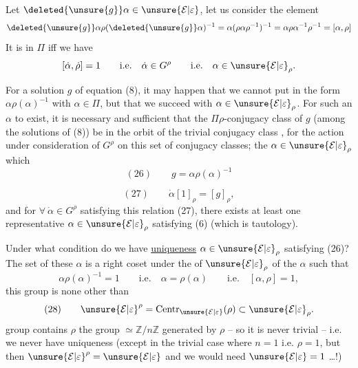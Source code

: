 Let $\deleted{\unsure{g}}\alpha\in\unsure{\mathcal E|\varepsilon}$, let us consider the element
\[
\deleted{\unsure{g}}\alpha\rho(\deleted{\unsure{g}}\alpha)^{-1}
=\alpha(\rho\alpha\rho^{-1})^{-1}
=\alpha\rho\alpha^{-1}\rho^{-1}=[\alpha,\rho]
\]
It is in $\Pi$ iff we have 
\[
[\dot\alpha,\dot\rho]=1\qquad\text{i.e.}\quad
\dot\alpha\in G^\rho\qquad\text{i.e.}\quad\alpha\in\unsure{\mathcal E|\varepsilon}_\rho.
\]

For a solution $g$ of equation (8), it may happen that we cannot put  in the  form $\alpha\rho(\alpha)^{-1}$ with $\alpha\in\Pi$, but that we succeed with $\alpha\in\unsure{\mathcal E|\varepsilon}_\rho$.
For such an $\alpha$ to exist, it is necessary and sufficient that the $\Pi\rho$-conjugacy class \inserted{$[g]_\rho$} of $g$ (among the solutions of (8)) be in the orbit of the trivial conjugacy class \inserted{$[1]_\rho$}, for the action under consideration of $G^\rho$ on this set of conjugacy classes;  the $\alpha\in\unsure{\mathcal E|\varepsilon}_\rho$ which 
\[
(26)\qquad g=\alpha\rho(\alpha)^{-1}
\]


\[
(27)\qquad\dot\alpha[1]_\rho=[g]_\rho,
\]
and for $\forall\ \dot\alpha\in G^\rho$ satisfying this relation (27), there exists at least one representative $\alpha\in\unsure{\mathcal E|\varepsilon}_\rho$ satisfying (6) (which is  tautology).

Under what condition do we have \uline{uniqueness}  $\alpha\in\unsure{\mathcal E|\varepsilon}_\rho$ satisfying (26)?
The set of these $\alpha$ is a right coset under the  of $\unsure{\mathcal E|\varepsilon}_\rho$  of the $\alpha$ such that 
\[
\alpha\rho(\alpha)^{-1}=1\qquad\text{i.e.}\quad
\alpha=\rho(\alpha)\qquad\text{i.e.}\quad[\alpha,\rho]=1,
\]
this group is none other than 
\[
(28)\qquad\unsure{\mathcal E|\varepsilon}^\rho=\operatorname{Centr}_{\unsure{\mathcal E|\varepsilon}}(\rho)\subset\unsure{\mathcal E|\varepsilon}_\rho.
\]
 group contains $\rho$  the group $\simeq\mathbb Z/n\mathbb Z$  generated by $\rho$ -- so it is never trivial -- i.e. we never have uniqueness (except in the trivial case where \deleted{\unsure{$\rho$}} $n=1$ i.e. $\rho=1$,  but then $\unsure{\mathcal E|\varepsilon}^\rho=\unsure{\mathcal E|\varepsilon}$ and we would need $\unsure{\mathcal E|\varepsilon}=1$ \dots !)

